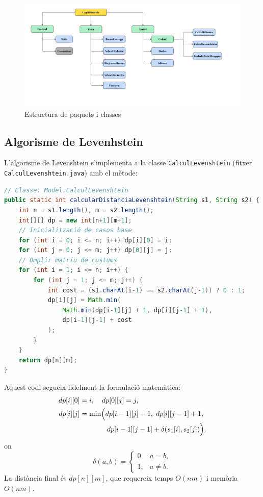 \documentclass{ieeetj}
\begin{document}
\begin{figure}[H]
    \centering
    \includegraphics[width=\linewidth, keepaspectratio]{png/estructura.jpg}
    \caption{Estructura de paquets i classes }
    \label{fig:enter-label}
\end{figure}

\subsection{Algorisme de  Levenhstein} 

L’algorisme de Levenshtein s’implementa a la classe \texttt{CalculLevenshtein} (fitxer \texttt{CalculLevenshtein.java}) amb el mètode:
\begin{lstlisting}[language=Java]
// Classe: Model.CalculLevenshtein
public static int calcularDistanciaLevenshtein(String s1, String s2) {
    int n = s1.length(), m = s2.length();
    int[][] dp = new int[n+1][m+1];
    // Inicialització de casos base
    for (int i = 0; i <= n; i++) dp[i][0] = i;
    for (int j = 0; j <= m; j++) dp[0][j] = j;
    // Omplir matriu de costums
    for (int i = 1; i <= n; i++) {
        for (int j = 1; j <= m; j++) {
            int cost = (s1.charAt(i-1) == s2.charAt(j-1)) ? 0 : 1;
            dp[i][j] = Math.min(
                Math.min(dp[i-1][j] + 1, dp[i][j-1] + 1),
                dp[i-1][j-1] + cost
            );
        }
    }
    return dp[n][m];
}
\end{lstlisting}
Aquest codi segueix fidelment la formulació matemàtica:
\[
\begin{aligned}
dp[i][0] &= i,\quad dp[0][j] = j, \\
dp[i][j] &= \min\Bigl(
    dp[i-1][j] + 1,\;
    dp[i][j-1] + 1, \\
&\quad\quad\quad\;\;\;
    dp[i-1][j-1] + \delta(s_1[i], s_2[j])
\Bigr).
\end{aligned}
\]
on
\[
\delta(a,b)=
\begin{cases}
0,&a=b,\\
1,&a\neq b.
\end{cases}
\]
La distància final és $dp[n][m]$, que requereix temps $O(nm)$ i memòria $O(nm)$.
\end{document}
